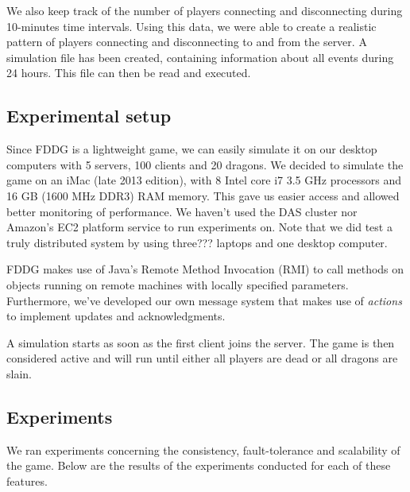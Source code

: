 We also keep track of the number of players connecting and disconnecting during 10-minutes time intervals. 
Using this data, we were able to create a realistic pattern of players connecting and disconnecting to and from the server.
A simulation file has been created, containing information about all events during 24 hours. This file can then be read and executed.

\subsection{Experimental setup}
\label{subsec:experimental_setup}

	Since FDDG is a lightweight game, we can easily simulate it on our desktop computers with 5 servers, 100 clients and 20 dragons. 
	We decided to simulate the game on an iMac (late 2013 edition), with 8 Intel core i7 3.5 GHz processors and 16 GB (1600 MHz DDR3) RAM memory. 
	This gave us easier access and allowed better monitoring of performance.
	We haven't used the DAS cluster nor Amazon's EC2 platform service to run experiments on. 
	Note that we did test a truly distributed system by using three??? laptops and one desktop computer.
	
	FDDG makes use of Java's Remote Method Invocation (RMI) to call methods on objects running on remote machines with locally specified parameters. 
	Furthermore, we've developed our own message system that makes use of \emph{actions} to implement updates and acknowledgments.
	
	A simulation starts as soon as the first client joins the server. The game is then considered active and will run until either all players are dead or all dragons are slain.


\subsection{Experiments}
\label{subsec:experiments}
	We ran experiments concerning the consistency, fault-tolerance and scalability of the game. Below are the results of the experiments conducted for each of these features.

